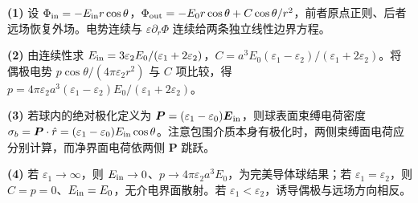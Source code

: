 \par\noindent\textbf{(1)} 设 \(\Phi_{\rm in}=-E_{\rm in}r\cos\theta\)，\(\Phi_{\rm out}=-E_0r\cos\theta+C\cos\theta/r^2\)，前者原点正则、后者远场恢复外场。电势连续与 \(\varepsilon\partial_r\Phi\) 连续给两条独立线性边界方程。
\par\noindent\textbf{(2)} 由连续性求 \(E_{\rm in}=3\varepsilon_2E_0/(\varepsilon_1+2\varepsilon_2)\)，\(C=a^3E_0(\varepsilon_1-\varepsilon_2)/(\varepsilon_1+2\varepsilon_2)\)。将偶极电势 \(p\cos\theta/(4\pi\varepsilon_2r^2)\) 与 \(C\) 项比较，得 \(p=4\pi\varepsilon_2a^3(\varepsilon_1-\varepsilon_2)E_0/(\varepsilon_1+2\varepsilon_2)\)。
\par\noindent\textbf{(3)} 若球内的绝对极化定义为 \(\boldsymbol P=(\varepsilon_1-\varepsilon_0)\boldsymbol E_{\rm in}\)，则球表面束缚电荷密度 \(\sigma_b=\boldsymbol P\cdot\hat r=(\varepsilon_1-\varepsilon_0)E_{\rm in}\cos\theta\)。注意包围介质本身有极化时，两侧束缚面电荷应分别计算，而净界面电荷依两侧 \(\boldsymbol P\) 跳跃。
\par\noindent\textbf{(4)} 若 \(\varepsilon_1\to\infty\)，则 \(E_{\rm in}\to0\)、\(p\to4\pi\varepsilon_2a^3E_0\)，为完美导体球结果；若 \(\varepsilon_1=\varepsilon_2\)，则 \(C=p=0\)、\(E_{\rm in}=E_0\)，无介电界面散射。若 \(\varepsilon_1<\varepsilon_2\)，诱导偶极与远场方向相反。
